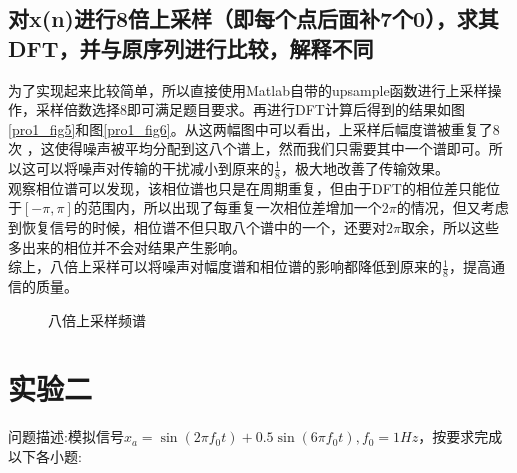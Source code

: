 \documentclass[UTF8]{article}
\begin{document}
\begin{CJK}{UTF8}{gkai}
\subsection{对x(n)进行8倍上采样（即每个点后面补7个0），求其DFT，并与原序列进行比较，解释不同}
为了实现起来比较简单，所以直接使用Matlab自带的upsample函数进行上采样操作，采样倍数选择8即可满足题目要求。再进行DFT计算后得到的结果如图\ref{pro1_fig5}和图\ref{pro1_fig6}。从这两幅图中可以看出，上采样后幅度谱被重复了8次 ，这使得噪声被平均分配到这八个谱上，然而我们只需要其中一个谱即可。所以这可以将噪声对传输的干扰减小到原来的$\frac{1}{8}$，极大地改善了传输效果。\\
观察相位谱可以发现，该相位谱也只是在周期重复，但由于DFT的相位差只能位于$[-\pi,\pi]$的范围内，所以出现了每重复一次相位差增加一个$2\pi$的情况，但又考虑到恢复信号的时候，相位谱不但只取八个谱中的一个，还要对$2\pi$取余，所以这些多出来的相位并不会对结果产生影响。\\
综上，八倍上采样可以将噪声对幅度谱和相位谱的影响都降低到原来的$\frac{1}{8}$，提高通信的质量。
\begin{figure}[H]
  \centering
  \caption{八倍上采样频谱}
  \label{pro1_fig56}
\end{figure}


\section{实验二}
问题描述:模拟信号$x_a=\sin(2\pi f_0t)+0.5\sin(6\pi f_0t),f_0=1Hz$，按要求完成以下各小题:

\end{CJK}
\end{document}
